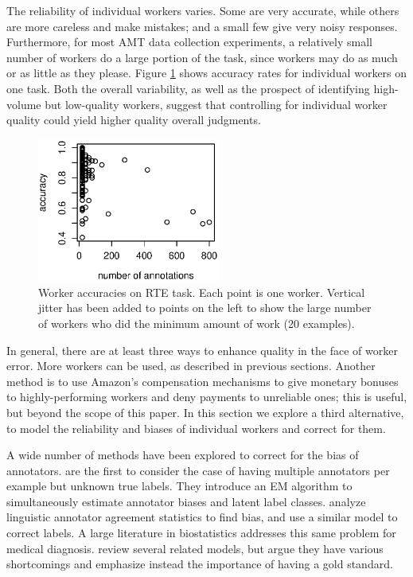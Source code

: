 \documentclass[11pt]{article}
\begin{document}
The reliability of individual workers varies.  Some are very accurate, while others are more careless and make mistakes; and a small few give very noisy responses.  Furthermore, for most AMT data collection experiments, a relatively small number of workers do a large portion of the task, since workers may do as much or as little as they please.  Figure \ref{Workers} shows accuracy rates for individual workers on one task.  Both the overall variability, as well as the prospect of identifying high-volume but low-quality workers, suggest that controlling for individual worker quality could yield higher quality overall judgments.

\begin{figure}[t]
\centering
\includegraphics[width=6cm]{figures/workers.eps}
\caption{Worker accuracies on RTE task.  Each point is one worker.  Vertical jitter has been added to points on the left to show the large number of workers who did the minimum amount of work (20 examples).} \label{Workers}
\end{figure}
In general, there are at least three ways to enhance quality in the face of worker error.  More workers can be used, as described in previous sections.  
Another method is to use Amazon's compensation mechanisms to give monetary bonuses to highly-performing workers and deny payments to unreliable ones; this is useful, but beyond the scope of this paper.  In this section we explore a third alternative, to model the reliability and biases of individual workers and correct for them.

A wide number of methods have been explored to correct for the bias of annotators.   are the first to consider the case of having multiple annotators per example but unknown true labels.  They introduce an EM algorithm to simultaneously estimate annotator biases and latent label classes.   analyze linguistic annotator agreement statistics to find bias, and use a similar model to correct labels.  A large literature in biostatistics addresses this same problem for medical diagnosis.   review several related models, but argue they have various shortcomings and emphasize instead the importance of having a gold standard.
\end{document}
